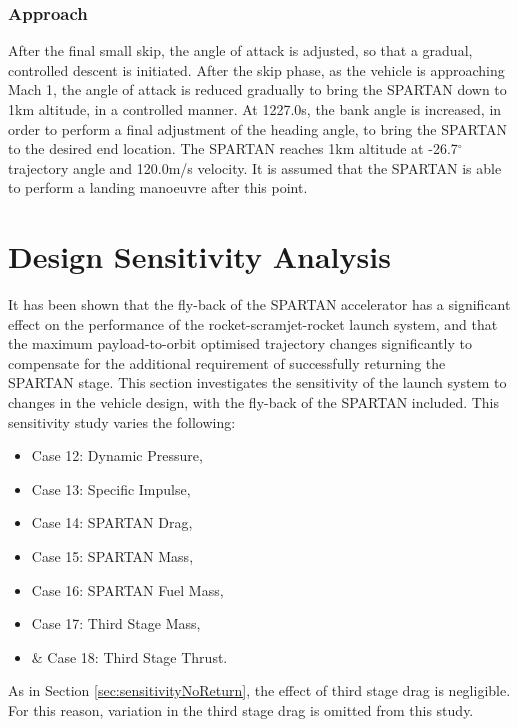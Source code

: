 \subsubsection{ Approach}

After the final small skip, the angle of attack is adjusted, so that a gradual, controlled descent is initiated. 
After the skip phase, as the vehicle is approaching Mach 1, the angle of attack is reduced gradually to bring the SPARTAN down to 1km altitude, in a controlled manner. At 1227.0s, the bank angle is increased, in order to perform a final adjustment of the heading angle, to bring the SPARTAN to the desired end location. 
The SPARTAN reaches 1km altitude at -26.7$^\circ$ trajectory angle and 120.0m/s velocity. It is assumed that the SPARTAN is able to perform a landing manoeuvre after this point. 








\section{Design Sensitivity Analysis}

It has been shown that the fly-back of the SPARTAN accelerator has a significant effect on the performance of the rocket-scramjet-rocket launch system, and that the maximum payload-to-orbit optimised trajectory changes significantly to compensate for the additional requirement of successfully returning the SPARTAN stage. This section investigates the sensitivity of the launch system to changes in the vehicle design, with the fly-back of the SPARTAN included. This sensitivity study varies the following:
\begin{itemize}
	\item Case 12: Dynamic Pressure, 
	\item Case 13: Specific Impulse,
	\item Case 14: SPARTAN Drag,
	\item Case 15: SPARTAN Mass,
	\item Case 16: SPARTAN Fuel Mass,
	\item Case 17: Third Stage Mass,
	\item \& Case 18: Third Stage Thrust.
\end{itemize}
As in Section \ref{sec:sensitivityNoReturn}, the effect of third stage drag is negligible. For this reason, variation in the third stage drag is omitted from this study. 

